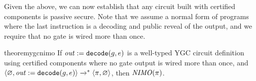 Given the above, we can now establish that any circuit built with
certified components is passive secure.  Note that we assume a normal
form of programs where the last instruction is a decoding and public
reveal of the output, and we require that no gate is wired more than once.
\begin{restatable}{theorem}{ygcnimo}
  \label{theorem-ygc-NIMO}
  If $\mathit{out} := \texttt{decode}(g,e)$ is a well-typed YGC circuit
  definition using certified components where no gate output is wired
  more than once, and
  $\langle \varnothing,\mathit{out} := \texttt{decode}(g,e) \rangle \xrightarrow{}^{*}
  \langle \pi,\varnothing \rangle$, then $\mathit{NIMO}(\pi)$.
\end{restatable}


\begin{comment}

\begin{fpfig}[t]{YGC copy gate definitions.}{fig-ygc-copy}
  {\footnotesize
    \begin{verbatimtab}
      sharetab2(gid, tid, k, p, b)
      {
        let r1 = k xor b in
        let r0 = (not k) xor (not b) in
        v[1,gate: || gid || tid || 1] := select(p,r1,r0);
        v[1,gate: || gid || tid || 2] := select(not p,r1,r0);
      }
      
      copygate(ca,cb,g)
      {
        let wl = owl(g) in
        let owl1 = owl(ca) in
        let owl2 = owl(cb) in
        sharetab2(ca,tt,wl.k,wl.p,owl1.k); sharetab2(ca,pt,wl.k,wl.p,owl1.p);
        sharetab2(cb,tt,wl.k,wl.p,owl2.k); sharetab2(cb,pt,wl.k,wl.p,owl2.p)
      }
      
      evalcopy(ca,cb,wv)
      {
        let wv1k = wv.k xor select(wv.p,v[1,gate: || ca || tt1], v[1,gate: || ca || tt2]) in
        let wv1p = wv.k xor select(wv.p,v[1,gate: || ca || pt1], v[1,gate: || ca || pt1]) in
        let wv2k = wv.k xor select(wv.p,v[1,gate: || cb || tt1], v[1,gate: || cb || tt2]) in
        let wv2p = wv.k xor select(wv.p,v[1,gate: || cb || pt1], v[1,gate: || cb || pt1]) in
        { wv1 = { k = wv1k; p = wv1p }; wv2 = { k = wv2k; p = wv2p } }  
      }

      copy(ca,cb,g,wv) { copygate(ca,cb,g); evalcopy(ca,cb,wv) } 
    \end{verbatimtab}
  }
\end{fpfig}

\subsection{Building and Extending Automatically Secure Circuits}
\label{section-composition-copy}


\end{comment}
